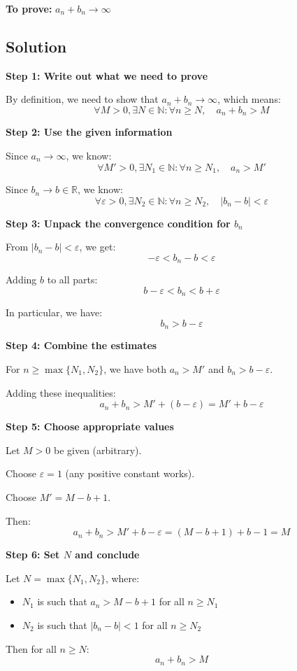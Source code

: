 \documentclass[12pt,a4paper]{article}
\theoremstyle{definition}
\theoremstyle{remark}
\begin{document}
\textbf{To prove:} $a_n + b_n \to \infty$

\subsection*{Solution}

\textbf{Step 1: Write out what we need to prove}

By definition, we need to show that $a_n + b_n \to \infty$, which means:
\[
\forall M > 0, \exists N \in \mathbb{N} : \forall n \geq N, \quad a_n + b_n > M
\]

\textbf{Step 2: Use the given information}

Since $a_n \to \infty$, we know:
\[
\forall M' > 0, \exists N_1 \in \mathbb{N} : \forall n \geq N_1, \quad a_n > M'
\]

Since $b_n \to b \in \mathbb{R}$, we know:
\[
\forall \varepsilon > 0, \exists N_2 \in \mathbb{N} : \forall n \geq N_2, \quad |b_n - b| < \varepsilon
\]

\textbf{Step 3: Unpack the convergence condition for $b_n$}

From $|b_n - b| < \varepsilon$, we get:
\[
-\varepsilon < b_n - b < \varepsilon
\]

Adding $b$ to all parts:
\[
b - \varepsilon < b_n < b + \varepsilon
\]

In particular, we have:
\[
b_n > b - \varepsilon
\]

\textbf{Step 4: Combine the estimates}

For $n \geq \max\{N_1, N_2\}$, we have both $a_n > M'$ and $b_n > b - \varepsilon$.

Adding these inequalities:
\[
a_n + b_n > M' + (b - \varepsilon) = M' + b - \varepsilon
\]

\textbf{Step 5: Choose appropriate values}

Let $M > 0$ be given (arbitrary).

Choose $\varepsilon = 1$ (any positive constant works).

Choose $M' = M - b + 1$.

Then:
\[
a_n + b_n > M' + b - \varepsilon = (M - b + 1) + b - 1 = M
\]

\textbf{Step 6: Set $N$ and conclude}

Let $N = \max\{N_1, N_2\}$, where:
\begin{itemize}
    \item $N_1$ is such that $a_n > M - b + 1$ for all $n \geq N_1$
    \item $N_2$ is such that $|b_n - b| < 1$ for all $n \geq N_2$
\end{itemize}
Then for all $n \geq N$:
\[
a_n + b_n > M
\]
\end{document}

